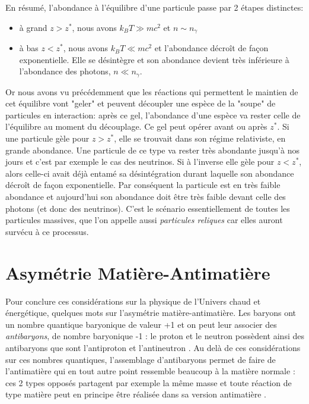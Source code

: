  
  En résumé, l'abondance à l'équilibre d'une particule passe par 2 étapes distinctes:
 \begin{itemize}
 \item à grand $z>z^*$, nous avons $k_B T \gg mc^2$ et $n\sim n_\gamma$
 \item à bas  $z<z^*$, nous avons $k_B T \ll mc^2$ et l'abondance décroît de façon exponentielle. Elle se désintègre et son abondance devient très inférieure à l'abondance des photons, $n\ll n_\gamma$.
 \end{itemize}
Or nous avons vu précédemment que les réactions qui permettent le maintien de cet équilibre vont "geler" et peuvent découpler une espèce de la "soupe" de particules en interaction: après ce gel, l'abondance d'une espèce va rester celle de l'équilibre au moment du découplage. Ce gel peut opérer avant ou après $z^*$. Si une particule gèle pour $z>z^*$, elle se trouvait dans son régime relativiste, en grande abondance. Une particule de ce type va rester très abondante jusqu'à nos jours et c'est par exemple le cas des neutrinos. Si à l'inverse elle gèle pour $z<z^*$, alors celle-ci avait déjà entamé sa désintégration durant laquelle son abondance décroît de façon exponentielle. Par conséquent la particule est en très faible abondance et aujourd'hui son abondance doit être très faible devant celle des photons (et donc des neutrinos). C'est le scénario essentiellement de toutes les particules massives, que l'on appelle aussi \textit{particules reliques} car elles auront survécu à ce processus.
 
 \section{Asymétrie Matière-Antimatière}
Pour conclure ces considérations sur la physique de l'Univers chaud et énergétique, quelques mots sur l'asymétrie matière-antimatière. Les baryons ont un nombre quantique baryonique de valeur +1 et on peut leur associer des \textit{antibaryons}, de nombre baryonique -1 : le proton et le neutron possèdent ainsi des antibaryons que sont l'antiproton et l'antineutron . Au delà de ces considérations sur ces nombres quantiques, l'assemblage d'antibaryons permet de faire de l'antimatière qui en tout autre point ressemble beaucoup à la matière normale : ces 2 types opposés partagent par exemple la même masse et toute réaction de type matière peut en principe être réalisée dans sa version antimatière .

